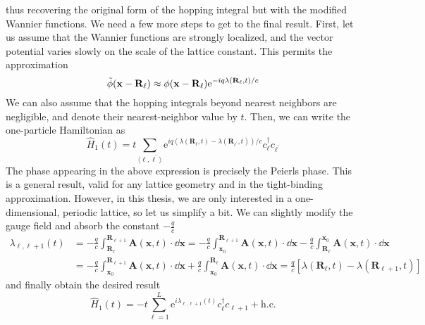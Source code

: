 thus recovering the original form of the hopping integral but with the modified Wannier functions.
We need a few more steps to get to the final result. First, let us assume that the Wannier functions
are strongly localized, and the vector potential varies slowly on the scale of the lattice constant.
This permits the approximation
\begin{equation}
    \Tilde{\phi}(\mathbf{x - \mathbf{R}_{\ell}}) \approx \phi(\mathbf{x - \mathbf{R}_{\ell}}) \mathrm{e}^{-i q \lambda(\mathbf{R}_{\ell} ,t) / c}
\end{equation}
We can also assume that the hopping integrals beyond nearest neighbors are negligible, and denote
their nearest-neighbor value by \(t\). Then, we can write the one-particle Hamiltonian as
\begin{equation}
    \hat{H} _1(t) = t \sum_{\langle \ell,\ell^{\prime} \rangle } \mathrm{e}^{i q \left( \lambda(\mathbf{R}_{\ell},t) -
    \lambda (\mathbf{R}_{\ell^{\prime}},t) \right) /c } c^{\dag}_{\ell}c_{\ell^{\prime}}
\end{equation}
The phase appearing in the above expression is precisely the Peierls phase. This is a general result, valid for
any lattice geometry and in the tight-binding approximation. However, in this thesis, we are only interested in a
one-dimensional, periodic lattice, so let us simplify a bit. We can slightly modify the gauge field
and absorb the constant \(-\frac{q}{c}\)
\begin{align}
    \lambda_{\ell,\ell+1}(t) & = -\frac{q}{c} \int_{\mathbf{R}_{\ell}}^{\mathbf{R}_{\ell+1}} \mathbf{A}(\mathbf{x},t)\cdot \dd{\mathbf{x}}
    = -\frac{q}{c} \int_{\mathbf{x}_0}^{\mathbf{R}_{\ell+1}}  \mathbf{A}(\mathbf{x},t) \cdot\dd{\mathbf{x}} - \frac{q}{c} \int_{\mathbf{R}_{\ell}}^{\mathbf{x}_0}  \mathbf{A}(\mathbf{x},t) \cdot\dd{\mathbf{x}} \nonumber              \\
                             & = -\frac{q}{c} \int^{\mathbf{R}_{\ell+1}}_{\mathbf{x}_0} \mathbf{A}(\mathbf{x},t) \cdot\dd{\mathbf{x}}+\frac{q}{c} \int_{\mathbf{x}_0}^{\mathbf{R}_{\ell}}  \mathbf{A}(\mathbf{x},t)\cdot\dd{\mathbf{x}}
    = \frac{q}{c}\left[ \lambda(\mathbf{R}_{\ell},t) - \lambda(\mathbf{R}_{\ell+1},t) \right]
    \label{eq:peierls_phase}
\end{align}
and finally obtain the desired result
\begin{equation}
    \hat{H} _1(t) = -t \sum_{ \ell=1}^{L} \mathrm{e}^{i \lambda_{\ell,\ell+1}(t) } c^{\dag}_{\ell}c_{\ell+1} + \mathrm{h.c.}
    \label{eq:peierls_hamiltonian}
\end{equation}
